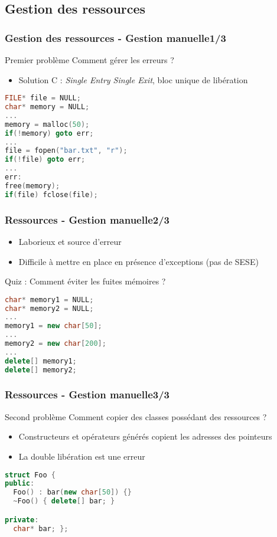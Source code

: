 \documentclass[C++.tex]{subfiles}
\begin{document}
\subsection*{Gestion des ressources}
\begin{frame}[fragile]
	\frametitle{Gestion des ressources - Gestion manuelle\titlehfill{}1/3}
	\begin{alertblock}{Premier problème}
		Comment gérer les erreurs ?
	\end{alertblock}

	\begin{itemize}
		\item Solution C : \textit{Single Entry Single Exit}, bloc unique de libération
	\end{itemize}

	\begin{lstlisting}[language=C++]
FILE* file = NULL;
char* memory = NULL;
...
memory = malloc(50);
if(!memory) goto err;
...
file = fopen("bar.txt", "r");
if(!file) goto err;
...
err:
free(memory);
if(file) fclose(file);\end{lstlisting}
\end{frame}

\begin{frame}[fragile]
	\frametitle{Ressources - Gestion manuelle\titlehfill{}2/3}
	\begin{itemize}
		\item Laborieux et source d'erreur
		\item Difficile à mettre en place en présence d'exceptions (pas de SESE)
	\end{itemize}

	\begin{block}{Quiz : Comment éviter les fuites mémoires ?}
		\begin{lstlisting}[language=C++]
char* memory1 = NULL;
char* memory2 = NULL;
...
memory1 = new char[50];
...
memory2 = new char[200];
...
delete[] memory1;
delete[] memory2;\end{lstlisting}
	\end{block}
\end{frame}

\begin{frame}[fragile]
	\frametitle{Ressources - Gestion manuelle\titlehfill{}3/3}
	\begin{alertblock}{Second problème}
		Comment copier des classes possédant des ressources ?
	\end{alertblock}

	\begin{itemize}
		\item Constructeurs et opérateurs générés copient les adresses des pointeurs
		\item La double libération est une erreur
	\end{itemize}

	\begin{lstlisting}[language=C++]
struct Foo {
public:
  Foo() : bar(new char[50]) {}
  ~Foo() { delete[] bar; }

private:
  char* bar; };\end{lstlisting}
\end{frame}
\end{document}
